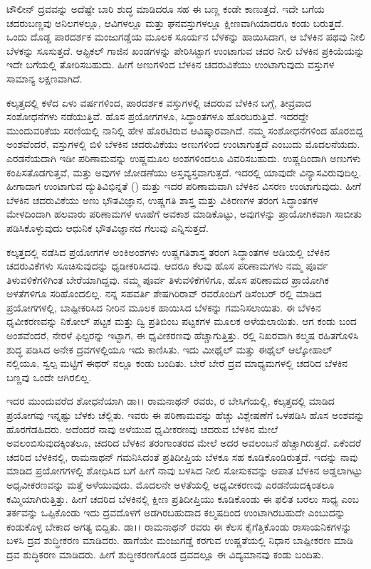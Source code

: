 ಟೌಲೀನ್ ದ್ರವವನ್ನು ಅದೆಷ್ಟೇ ಬಾರಿ ಶುದ್ಧ ಮಾಡಿದರೂ ಸಹ ಈ ಬಣ್ಣ ಕಂಡೇ ಕಾಣುತ್ತದೆ. ಇದೇ ಬಗೆಯ ಚದರುಬಣ್ಣವು ಅನಿಲಗಳಲ್ಲೂ, ಆವಿಗಳಲ್ಲೂ ಮತ್ತು ಘನವಸ್ತುಗಳಲ್ಲೂ ಕ್ಷೀಣವಾಗಿಯಾದರೂ ಕಂಡು ಬರುತ್ತದೆ. ಒಂದು ದೊಡ್ಡ ಪಾರದರ್ಶಕ ಮಂಜುಗಡ್ಡೆಯ ಮೂಲಕ ಸೂರ್ಯನ ಬೆಳಕನ್ನು ಹಾಯಿಸಿದಾಗ, ಆ ಬೆಳಕಿನ ಪಥವು ನೀಲಿ ಬೆಳಕನ್ನು ಸೂಸುತ್ತದೆ. ಆಪ್ಟಿಕಲ್ ಗಾಜಿನ ಖಂಡಗಳನ್ನು ಪೇರಿಸಿಟ್ಟಾಗ ಉಂಟಾಗುವ ಚದರ ನೀಲಿ ಬೆಳಕಿನ ಪ್ರಕಿಯೆಯನ್ನು ಇದೇ ಬಗೆಯಲ್ಲಿ ತೋರಿಸಬಹುದು. ಹೀಗೆ ಅಣುಗಳಿಂದ ಬೆಳಕಿನ ಚದರುವಿಕೆಯು ಉಂಟಾಗುವುದು ವಸ್ತುಗಳ ಸಾಮಾನ್ಯ ಲಕ್ಷಣವಾಗಿದೆ.

ಕಲ್ಕತ್ತದಲ್ಲಿ ಕಳೆದ ಏಳು ವರ್ಷಗಳಿಂದ, ಪಾರದರ್ಶಕ ವಸ್ತುಗಳಲ್ಲಿ ಚದರುವ ಬೆಳಕಿನ ಬಗ್ಗೆ, ತೀವ್ರವಾದ ಸಂಶೋಧನೆಗಳು ನಡೆಯುತ್ತಿವೆ. ಹೊಸ ಪ್ರಯೋಗಗಳೂ, ಸಿದ್ಧಾಂತಗಳೂ ಹೊರ\-ಬರುತ್ತಿವೆ. ಇದರದ್ದೇ ಮುಂದುವರಿಕೆಯ ಸರಣಿಯಲ್ಲಿ  ನಾನಿಲ್ಲಿ ಹೇಳ ಹೊರಟಿರುವ ಆವಿಷ್ಕಾರವಾಗಿದೆ. ನಮ್ಮ ಸಂಶೋಧನೆಗಳಿಂದ ಹೊರಬಿದ್ದ ಅಂಶವೆಂದರೆ, ವಸ್ತುಗಳಲ್ಲಿ ಬಿಳಿ ಬೆಳಕಿನ ಚದರುವಿಕೆಯು ಅಣುಗಳಿಂದ ಉಂಟಾಗುತ್ತದೆ ಎಂಬುದು ಮೊದಲನೆಯದು. ಎರಡನೆಯದಾಗಿ ಇಡೀ ಪರಿಣಾಮ\-ವನ್ನು ಉಷ್ಣಮೂಲ ಅಂಶಗಳಿಂದಲೂ ವಿವರಿಸಬಹುದು. ಉಷ್ಣದಿಂದಾಗಿ ಅಣುಗಳು ಕಂಪಿಸ\-ತೊಡಗುತ್ತವೆ, ಮತ್ತು ಅವುಗಳ ಜೋಡಣೆಯು ಅಸ್ತವ್ಯಸ್ತವಾಗುತ್ತದೆ. ಇದರಲ್ಲಿ ಯಾವುದೇ ವಿನ್ಯಾಸವಿರುವುದಿಲ್ಲ. ಹೀಗಾದಾಗ ಉಂಟಾಗುವ ದ್ಯುತಿವಿಭಿನ್ನತೆ () ಮತ್ತು ಇದರ ಪರಿಣಾಮವಾಗಿ ಬೆಳಕಿನ ವಿಸರಣ ಉಂಟಾಗುವುದು. ಹೀಗೆ ಬೆಳಕಿನ ಚದರುವಿಕೆಯು ಅಣು ಭೌತವಿಜ್ಞಾನ, ಉಷ್ಣಗತಿ ಶಾಸ್ತ್ರ ಮತ್ತು ವಿಕಿರಣಗಳ ತರಂಗ ಸಿದ್ಧಾಂತಗಳ ಮೇಳದಿಂದಾಗಿ ಹಲವಾರು ಪರಿಣಾಮಗಳ ಊಹೆಗೆ ಅವಕಾಶ ಮಾಡಿಕೊಟ್ಟು, ಅವುಗಳನ್ನು ಪ್ರಾಯೋಗಿಕವಾಗಿ ಸಾಬೀತು ಪಡಿಸಿಕೊಳ್ಳುವುದು ಆಧುನಿಕ ಭೌತವಿಜ್ಞಾನದ ಗೆಲುವು ಎನ್ನಿಸುತ್ತದೆ.



ಕಲ್ಕತ್ತದಲ್ಲಿ ನಡೆಸಿದ ಪ್ರಯೋಗಗಳ ಅಂಕಿಅಂಶಗಳು ಉಷ್ಣಗತಿಶಾಸ್ತ್ರ ತರಂಗ ಸಿದ್ಧಾಂತಗಳ ಅಡಿಯಲ್ಲಿ ಬೆಳಕಿನ ಚದರುವಿಕೆಗಳು ಸೂಚಿಸುವುದನ್ನು ಧೃಡೀಕರಿಸಿದವು. ಆದರೂ ಕೆಲವು ಹೊಸ ಪರಿಣಾಮಗಳು ನಮ್ಮ ಪೂರ್ವ ತಿಳುವಳಿಕೆಗಳಿಗಿಂತ ಬೇರೆಯಾಗಿದ್ದವು. ನಮ್ಮ ಪೂರ್ವ\break
 ತಿಳುವಳಿಕೆಗಳಿಗೂ, ಹೊಸ ಪರಿಣಾಮದ ಪ್ರಾಯೋಗಿಕ ಅಳತೆಗಳಿಗೂ ಸರಿಹೊಂದಲಿಲ್ಲ. ನನ್ನ ಸಹವರ್ತಿ ಶೇಷಗಿರಿರಾವ್ ರವರೊಂದಿಗೆ ಡಿಸೆಂಬರ್ ರಲ್ಲಿ ಮಾಡಿದ ಪ್ರಯೋಗಗಳಲ್ಲಿ,\break
 ಬಾಷ್ಪೀಕರಿಸಿದ ನೀರಿನ ಮೂಲಕ ಹಾಯಿಸಿದ ಬೆಳಕನ್ನು ಗಮನಿಸಲಾಯಿತು. ಈ ಬೆಳಕಿನ ಧೃವೀಕರಣವನ್ನು ನಿಕೋಲ್ ಪಟ್ಟಕ ಮತ್ತು ದ್ವಿ ಪ್ರತಿಬಿಂಬ ಪಟ್ಟಕಗಳ ಮೂಲಕ ಅಳೆಯಲಾಯಿತು. ಆಗ ಕಂಡು ಬಂದ ಅಂಶವೆಂದರೆ, ನೇರಳೆ ಫಿಲ್ಟರನ್ನು ಇಟ್ಟಾಗ, ಈ ಧೃವೀಕರಣವು ಹೆಚ್ಚಾಗುತ್ತಿತ್ತು. ರಲ್ಲಿ ನಿಖರವಾಗಿ ಕಲ್ಮಷ ರಹಿತಗೊಳಿಸಿ ಶುದ್ಧ ಪಡಿಸಿದ ಅನೇಕ ದ್ರವಗಳಲ್ಲಿಯೂ ಇದು ಕಾಣಿಸಿತು. ಇದು ಮೀಥೈಲ್ ಮತ್ತು ಈಥೈಲ್ ಆಲ್ಕೋಹಾಲ್ ನಲ್ಲಿಯೂ, ಸ್ವಲ್ಪ ಮಟ್ಟಿಗೆ ಈಥರ್ ನಲ್ಲೂ ಕಂಡು ಬಂದಿತು. ಬೇರೆ ಬೇರೆ ದ್ರವ ಮಾಧ್ಯಮಗಳಲ್ಲಿ ಚದರಿದ ಬೆಳಕಿನ ಬಣ್ಣವು ಒಂದೇ ಆಗಿರಲಿಲ್ಲ.

ಇದರ ಮುಂದುವರೆದ ಶೋಧನೆಯಾಗಿ ಡಾ।। ರಾಮನಾಥನ್ ರವರು, ರ ಬೇಸಿಗೆಯಲ್ಲಿ, ಕಲ್ಕತ್ತದಲ್ಲಿ ಮಾಡಿದ ಪ್ರಯೋಗವು ಇನ್ನಷ್ಟು ಬೆಳಕು ಚೆಲ್ಲಿತು. ಇವರು ಈ ಪರಿಣಾಮವನ್ನು ಹೆಚ್ಚು ವಿಶ್ಲೇಷಣೆಗೆ ಒಳಪಡಿಸಿ ಹೊಸ ಅಂಶವನ್ನು ಹೊರಗೆಡಹಿದರು. ಅದೆಂದರೆ ನಾವು ಅಳೆಯುವ ಧೃವೀಕರಣವು ಚದರುವ ಬೆಳಕಿನ ಮೇಲೆ ಅವಲಂಬಿಸುವುದಕ್ಕಿಂತಲೂ, ಚದರಿದ ಬೆಳಕಿನ\break
 ತರಂಗಾಂತರದ ಮೇಲೆ ಅದರ ಅವಲಂಬನೆ ಹೆಚ್ಚಾಗಿರುತ್ತದೆ. ಏಕೆಂದರೆ ಚದರಿದ ಬೆಳಕಿನಲ್ಲಿ, ರಾಮನಾಥನ್ ಗಮನಿಸಿದಂತೆ ಪ್ರತಿದೀಪ್ತಿಯ ಬೆಳಕೂ ಸಹ ಕೂಡಿಕೊಂಡಿರುತ್ತದೆ. ಇದನ್ನು ನಾವು ಮಾಡಿದ ಪ್ರಯೋಗಗಳಲ್ಲಿ ಶೋಧಿಸಿದ ಬಗೆ ಹೀಗೆ \enginline{--} ನಾವು ಬಳಸಿದ ನೀಲಿ ಸೋಸುಕವನ್ನು ಆಪಾತ ಬೆಳಕಿನ ಅಡ್ಡಲಾಗಿಟ್ಟು ಅಧೃವೀಕರಣವನ್ನು ಮತ್ತೆ ಅಳೆಯುವುದು. ಮೊದಲನೇ ಅಳತೆಯಲ್ಲಿ ಅಧೃವೀಕರಣವು ಎರಡನೆಯದಕ್ಕಿಂತಲೂ ಕಮ್ಮಿಯಾಗಿರುತ್ತಿತ್ತು. ಹೀಗೆ ಚದರಿದ ಬೆಳಕಿನಲ್ಲಿ ಕ್ಷೀಣ ಪ್ರತಿದೀಪ್ತಿಯು ಕೂಡಿಕೊಂಡು ಈ ಫಲಿತ ಬರಲು ಸಾಧ್ಯ ಎಂಬ ತರ್ಕವನ್ನು ಒಪ್ಪಿಕೊಂಡು ಇದು ದ್ರವದೊಳಗೆ ಅಡಗಿರಬಹುದಾದ ಕಲ್ಮಷದಿಂದ ಉಂಟಾಗಿರಬಹುದೇ ಎಂಬುದನ್ನು ಕಂಡುಕೊಳ್ಳ ಬೇಕಾದ ಅಗತ್ಯ ಬಿದ್ದಿತು. ಡಾ।। ರಾಮನಾಥನ್ ರವರು ಈ ಕೆಲಸ ಕೈಗೆತ್ತಿಕೊಂಡು ರಾಸಾಯನಿಕಗಳನ್ನು ಬಳಸಿ ದ್ರವ ಶುದ್ಧೀಕರಣ ಮಾಡಿದರು. ಹಾಗೆಯೇ ಮಂಜುಗಡ್ಡೆ ಕರಗುವ ಉಷ್ಣತೆಯಲ್ಲಿ ನಿಧಾನ ಬಾಷ್ಪೀಕರಣ ಮಾಡಿ ದ್ರವ ಶುದ್ಧಿಕರಣ ಮಾಡಿದರು. ಹೀಗೆ ಶುದ್ಧೀಕರಣಗೊಂಡ ದ್ರವದಲ್ಲೂ ಈ ವಿದ್ಯಮಾನವು ಕಂಡು ಬಂದಿತು.

